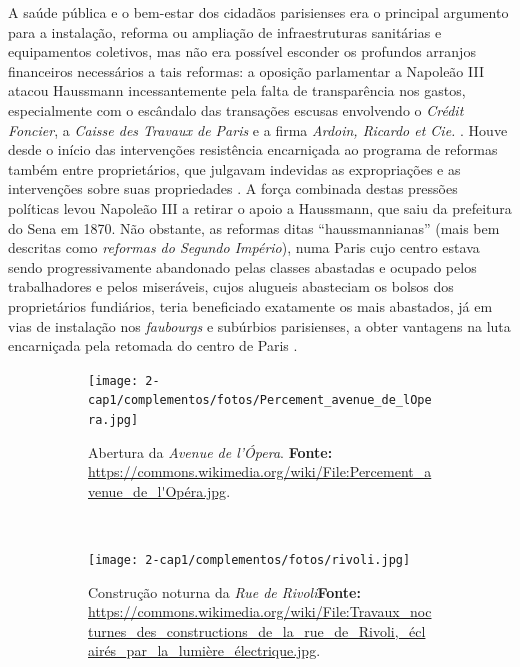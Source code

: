 A saúde pública e o bem-estar dos cidadãos parisienses era o principal argumento para a instalação, reforma ou ampliação de infraestruturas sanitárias e equipamentos coletivos, mas não era possível esconder os profundos arranjos financeiros necessários a tais reformas: a oposição parlamentar a Napoleão III atacou Haussmann incessantemente pela falta de transparência nos gastos, especialmente com o escândalo das transações escusas envolvendo o \textit{Crédit Foncier}, a \textit{Caisse des Travaux de Paris} e a firma \textit{Ardoin, Ricardo et Cie.} \cite{pinkney_paris_1957}. Houve desde o início das intervenções resistência encarniçada ao programa de reformas também entre proprietários, que julgavam indevidas as expropriações e as intervenções sobre suas propriedades \cite{paccoud_hauspropr_2012}. A força combinada destas pressões políticas levou Napoleão III a retirar o apoio a Haussmann, que saiu da prefeitura do Sena em 1870. Não obstante, as reformas ditas ``haussmannianas'' (mais bem descritas como \textit{reformas do Segundo Império}), numa Paris cujo centro estava sendo progressivamente abandonado pelas classes abastadas e ocupado pelos trabalhadores e pelos miseráveis, cujos alugueis abasteciam os bolsos dos proprietários fundiários, teria beneficiado exatamente os mais abastados, já em vias de instalação nos \textit{faubourgs} e subúrbios parisienses, a obter vantagens na luta encarniçada pela retomada do centro de Paris \cite{faure_paris_2004}.

\begin{figure}[!htp]
\centering
\caption{Duas obras do período de Georges Eugène Haussmann à frente da prefeitura do Sena.}
\begin{subfigure}{0.9\textwidth}
\centering
\texttt{[image: 2-cap1/complementos/fotos/Percement\_avenue\_de\_lOpera.jpg]}{\par \footnotesize Abertura da \textit{Avenue de l'Ópera}. \textbf{Fonte:} \url{https://commons.wikimedia.org/wiki/File:Percement_avenue_de_l'Opéra.jpg}.}
\label{fig:aberturaopera}
\end{subfigure}
\
\begin{subfigure}{0.9\textwidth}
\centering
\texttt{[image: 2-cap1/complementos/fotos/rivoli.jpg]}{\par \footnotesize Construção noturna da \textit{Rue de Rivoli}\textbf{Fonte:} \url{https://commons.wikimedia.org/wiki/File:Travaux_nocturnes_des_constructions_de_la_rue_de_Rivoli,_éclairés_par_la_lumière_électrique.jpg}. }
\label{fig:obrasrivoli}
\end{subfigure}
\end{figure}

